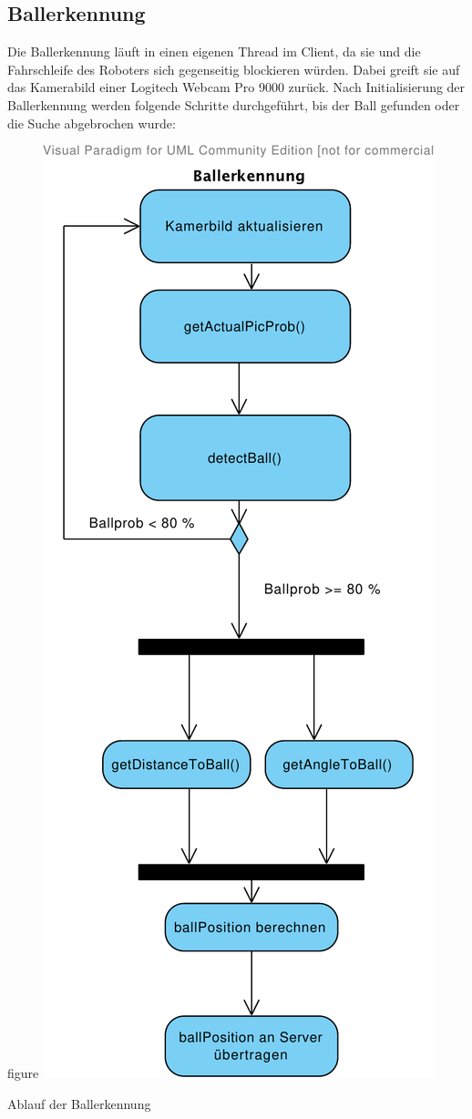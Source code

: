\subsection{Ballerkennung}

\label{sec:balldetection}
Die Ballerkennung läuft in einen eigenen Thread im Client, da sie und
die Fahrschleife des Roboters sich gegenseitig blockieren
würden. Dabei greift sie auf das Kamerabild einer Logitech Webcam Pro 9000
zurück. Nach Initialisierung der Ballerkennung
werden folgende Schritte durchgeführt, bis der Ball gefunden oder die
Suche abgebrochen wurde:

\begin{nofloat}{figure}
\centering
\includegraphics[width=0.5\linewidth]{bilder/balldetect_uml}
  \caption{Ablauf der Ballerkennung}
\end{nofloat}
